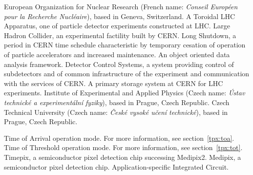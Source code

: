 
		{European Organization for Nuclear Research (French name: \textit{Conseil Européen pour la Recherche Nucléaire}), based in Geneva, Switzerland.}
		{A Toroidal LHC Apparatus, one of particle detector experiments constructed at LHC.}
		{Large Hadron Collider, an experimental factility built by CERN.}
		{Long Shutdown, a period in CERN time schedule characteristic by temporary cesation of operation of particle accelerators and increased maintenance.}
		{An object oriented data analysis framework. \cite{Brun199781}}
		{Detector Control Systems, a system providing control of subdetectors and of common infrastructure of the experiment and communication with the services of CERN.}
		{A primary storage system at CERN for LHC experiments.}
		{Institute of Experimental and Applied Physics (Czech name: \textit{Ústav technické a experimentální fyziky}), based in Prague, Czech Republic.}
		{Czech Technical University (Czech name: \textit{České vysoké učení technické}), based in Prague, Czech Republic.}

		{Time of Arrival operation mode. For more information, see section~\ref{tpx:toa}.}
		{Time of Threshold operation mode. For more information, see section~\ref{tpx:tot}.}
		{Timepix, a semiconductor pixel detection chip successing Medipix2.}
		{Medipix, a semiconductor pixel detection chip.}
		{Application-specific Integrated Circuit.}

